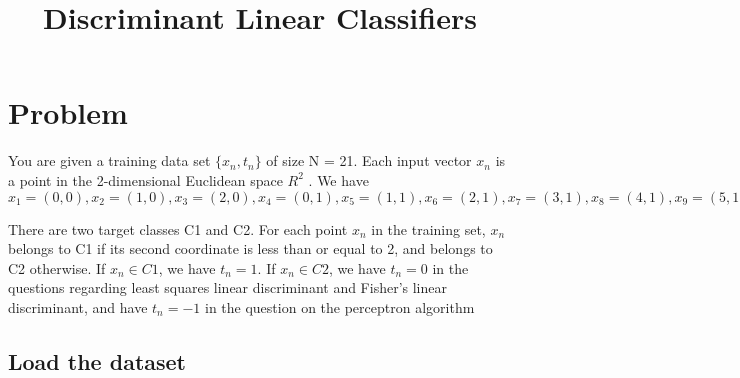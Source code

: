 \documentclass[11pt]{article}
\title{Discriminant Linear Classifiers}
\begin{document}
    
    
    \maketitle
    
    

    
    \section{Problem}\label{problem}

You are given a training data set \(\{x_n , t_n \}\) of size N = 21.
Each input vector \(x_n\) is a point in the 2-dimensional Euclidean
space \(R^2\) . We have
\(x_1 = (0, 0), x_2 = (1, 0), x_3 = (2, 0), x_4 = (0, 1), x_5 = (1, 1), x_6 = (2, 1), x_7 = (3, 1), x_8 = (4, 1), x_9 = (5, 1), x_{10} = (100, 1), x_{11} = (0, 2), x_{12} = (1, 2), x_{13} = (2, 2), x_{14} = (3, 2), x_{15} = (4, 2), x_{16} = (5, 2), x_{17} = (100, 2), x_{18} = (3, 3), x_{19} = (4, 3), x_{20} = (5, 3), x_{21} = (100, 3)\)

There are two target classes C1 and C2. For each point \(x_n\) in the
training set, \(x_n\) belongs to C1 if its second coordinate is less
than or equal to 2, and belongs to C2 otherwise. If \(x_n \in C1\), we
have \(t_n = 1\). If \(x_n \in C2\), we have \(t_n = 0\) in the
questions regarding least squares linear discriminant and Fisher's
linear discriminant, and have \(t_n = -1\) in the question on the
perceptron algorithm

    \subsection{Load the dataset}\label{load-the-dataset}
\end{document}
